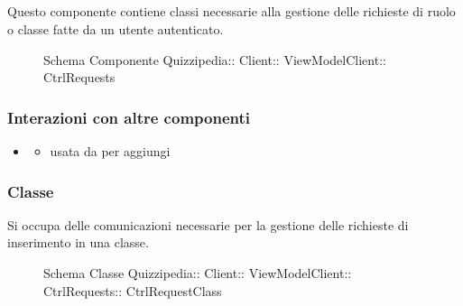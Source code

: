 \subsection{}
Questo componente contiene classi necessarie alla gestione delle richieste di ruolo o classe fatte da un utente autenticato.
\begin{figure}[H]
\centering
\noindent{}
\caption[Schema Componente CtrlRequests]{Schema Componente Quizzipedia:: Client:: ViewModelClient:: CtrlRequests}
\end{figure}
\subsubsection{Interazioni con altre componenti}
\begin{itemize}
\item {}
\begin{itemize}
\item usata da  per aggiungi
\end{itemize}
\end{itemize}
\subsubsection{Classe }
Si occupa delle comunicazioni necessarie per la gestione delle richieste di inserimento in una classe.
\begin{figure}[H]
\centering
\noindent{}
\caption[Schema Classe CtrlRequestClass]{Schema Classe Quizzipedia:: Client:: ViewModelClient:: CtrlRequests:: CtrlRequestClass}
\end{figure}
